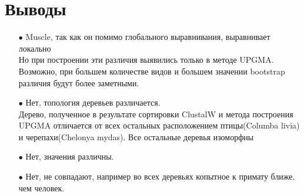 \section{Выводы}
\begin{enumerate}
\item[$\bullet$] Muscle, так как он помимо глобального выравнивания, выравнивает локально\\
	Но при построении эти различия выявились только в методе UPGMA. Возможно, при большем количестве видов и большем значении bootstrap различия будут более заметными.
\item[$\bullet$] Нет, топология деревьев различается.\\
	Дерево, полученное в результате сортировки ClustalW и метода построения UPGMA отличается от всех остальных расположением птицы(Columba livia) и черепахи(Chelonya mydas). Все остальные деревья изоморфны
\item[$\bullet$] Нет, значения различны.
\item[$\bullet$] Нет, не совпадают, например во всех деревьях копытное к примату ближе, чем человек.
\end{enumerate}
